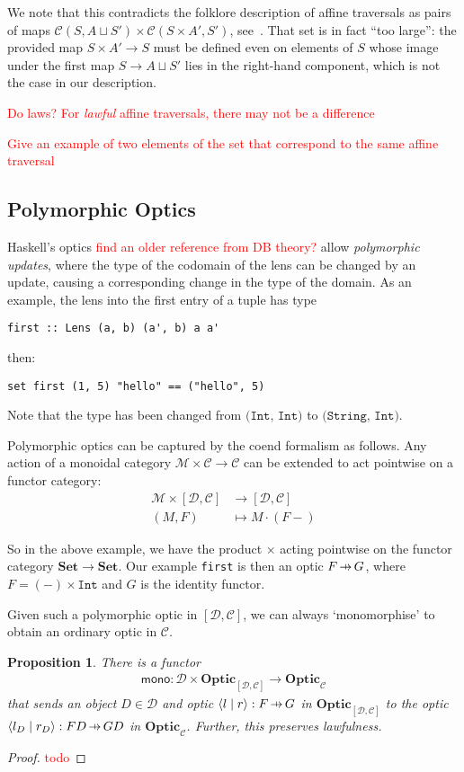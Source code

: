 \documentclass[11pt,a4paper]{article}
\theoremstyle{plain}
\newtheorem{proposition}[theorem]{Proposition}
\theoremstyle{definition}
\newcommand{\C}{\mathscr{C}}
\newcommand{\D}{\mathscr{D}}
\newcommand{\M}{\mathscr{M}}
\newcommand{\Set}{\mathbf{Set}}
\newcommand{\Optic}{\mathbf{Optic}}
\newcommand{\rep}[2]{{\ensuremath \left\langle #1 \mid #2 \right\rangle}}
\newcommand{\hto}{\ensuremath{\,\mathaccent\shortmid\rightarrow\,}}
\newcommand{\todo}[1]{\textcolor{red}{\small #1}}
\begin{document}
We note that this contradicts the folklore description of affine traversals as pairs of maps $\C(S, A \sqcup S') \times \C(S\times A', S')$, see~\cite{AffineTraversalPost}. That set is in fact ``too large'': the provided map $S \times A' \to S$ must be defined even on elements of $S$ whose image under the first map $S \to A \sqcup S'$ lies in the right-hand component, which is not the case in our description.

\todo{Do laws? For \emph{lawful} affine traversals, there may not be a difference}

\todo{Give an example of two elements of the set that correspond to the same affine traversal}

\subsection{Polymorphic Optics}
Haskell's optics \todo{find an older reference from DB theory?} allow \emph{polymorphic updates}, where the type of the codomain of the lens can be changed by an update, causing a corresponding change in the type of the domain. As an example, the lens into the first entry of a tuple has type
\begin{verbatim}
first :: Lens (a, b) (a', b) a a'
\end{verbatim}
then:
\begin{verbatim}
set first (1, 5) "hello" == ("hello", 5)
\end{verbatim}
Note that the type has been changed from $\texttt{(Int, Int)}$ to $\texttt{(String, Int)}$.

Polymorphic optics can be captured by the coend formalism as follows. Any action of a monoidal category $\M \times \C \to \C$ can be extended to act pointwise on a functor category:
\begin{align*}
  \M \times [\D, \C] &\to [\D, \C] \\
  (M, F) &\mapsto  M \cdot (F-)
\end{align*}

So in the above example, we have the product $\times$ acting pointwise on the functor category $\Set \to \Set$. Our example \texttt{first} is then an optic $F \hto G$, where $F = (-) \times \mathtt{Int}$ and $G$ is the identity functor.

Given such a polymorphic optic in $[\D, \C]$, we can always `monomorphise' to obtain an ordinary optic in $\C$.
\begin{proposition}
  There is a functor
  \begin{align*}
    \mathsf{mono} : \D \times \Optic_{[\D, \C]} \to \Optic_\C
  \end{align*}
  that sends an object $D \in \D$ and optic $\rep{l}{r } : F \hto G$ in $\Optic_{[\D, \C]}$ to the optic $\rep{l_D}{r_D } : FD \hto GD$ in $\Optic_\C$. Further, this preserves lawfulness.
\end{proposition}
\begin{proof}
  \todo{todo}
\end{proof}
\end{document}
